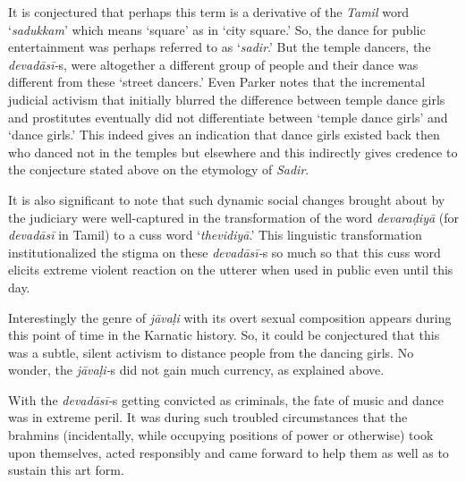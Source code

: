 It is conjectured that perhaps this term is a derivative of the \textit{Tamil} word ‘\textit{sadukkam}’ which means ‘square’ as in ‘city square.’ So, the dance for public entertainment was perhaps referred to as ‘\textit{sadir}.’ But the temple dancers, the \textit{devadāsī-}s, were altogether a different group of people and their dance was different from these ‘street dancers.’ Even Parker notes that the incremental judicial activism that initially blurred the difference between temple dance girls and prostitutes eventually did not differentiate between ‘temple dance girls’ and ‘dance girls.’ This indeed gives an indication that dance girls existed back then who danced not in the temples but elsewhere and this indirectly gives credence to the conjecture stated above on the etymology of \textit{Sadir}.

It is also significant to note that such dynamic social changes brought about by the judiciary were well-captured in the transformation of the word \textit{devaraḍiyā} (for \textit{devadāsī} in Tamil) to a cuss word ‘\textit{thevidiyā}.’ This linguistic transformation institutionalized the stigma on these \textit{devadāsī-}s so much so that this cuss word elicits extreme violent reaction on the utterer when used in public even until this day.

Interestingly the genre of \textit{jāvaḷi} with its overt sexual composition appears during this point of time in the Karnatic history. So, it could be conjectured that this was a subtle, silent activism to distance people from the dancing girls. No wonder, the \textit{jāvaḷi-}s did not gain much currency, as explained above.

With the \textit{devadāsī-}s getting convicted as criminals, the fate of music and dance was in extreme peril. It was during such troubled circumstances that the brahmins (incidentally, while occupying positions of power or otherwise) took upon themselves, acted responsibly and came forward to help them as well as to sustain this art form.

